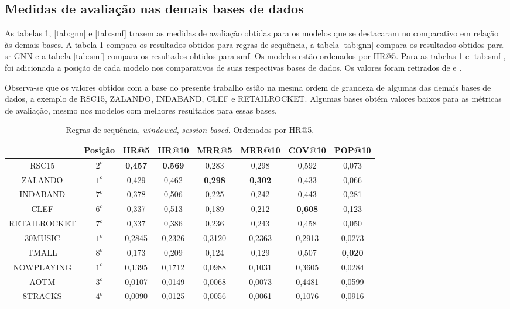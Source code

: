 \subsection{Medidas de avaliação nas demais bases de dados}
As tabelas \ref{tab:sr}, \ref{tab:gnn} e \ref{tab:smf} trazem as medidas de
avaliação obtidas para os modelos que se destacaram no comparativo em relação às
demais bases. A tabela \ref{tab:sr} compara os resultados obtidos para regras de
sequência, a tabela \ref{tab:gnn} compara os resultados obtidos para sr-GNN e a
tabela \ref{tab:smf} compara os resultados obtidos para smf. Os modelos estão
ordenados por HR@5. Para as tabelas \ref{tab:sr} e \ref{tab:smf}, foi adicionada
a posição de cada modelo nos comparativos de suas respectivas bases de dados. Os
valores foram retirados de \citet{ludewig2020advances} e
\citet{shehzad2024performance}.

Observa-se que os valores obtidos com a base do presente trabalho estão na mesma
ordem de grandeza de algumas das demais bases de dados, a exemplo de RSC15,
ZALANDO, INDABAND, CLEF e RETAILROCKET. Algumas bases obtém
valores baixos para as métricas de avaliação, mesmo nos modelos com melhores
resultados para essas bases.

\begin{table}
\centering
\vspace{1mm}
\begin{tabular}{cccccccc}
\hline
 & Posição & HR@5 & HR@10 & MRR@5 & MRR@10 & COV@10 & POP@10 \\
\hline
RSC15& $2^o$ & \textbf{0,457} & \textbf{0,569} & 0,283 & 0,298 & 0,592 & 0,073 \\
ZALANDO& $1^o$ & 0,429 & 0,462 & \textbf{0,298} & \textbf{0,302} & 0,433 & 0,066 \\
INDABAND& $7^o$ & 0,378 & 0,506 & 0,225 & 0,242 & 0,443 & 0,281 \\
CLEF& $6^o$ & 0,337 & 0,513 & 0,189 & 0,212 & \textbf{0,608} & 0,123 \\
RETAILROCKET& $7^o$ &  0,337 & 0,386 & 0,236 & 0,243 & 0,458 & 0,050 \\
30MUSIC& $1^o$ & 0,2845 & 0,2326 & 0,3120  & 0,2363 & 0,2913 & 0,0273 \\
TMALL& $8^o$ &  0,173 & 0,209 & 0,124 & 0,129 & 0,507 & \textbf{0,020} \\
NOWPLAYING& $1^o$ & 0,1395 & 0,1712 & 0,0988 & 0,1031 & 0,3605 & 0,0284 \\
AOTM& $3^o$ & 0,0107 & 0,0149 & 0,0068 & 0,0073 & 0,4481 & 0,0599 \\
8TRACKS& $4^o$ & 0,0090 & 0,0125 & 0,0056 & 0,0061 & 0,1076 & 0,0916 \\
\hline
\end{tabular}
\caption{Regras de sequência, \textit{windowed}, \textit{session-based}. Ordenados por HR@5.}
\label{tab:sr}
\end{table}

